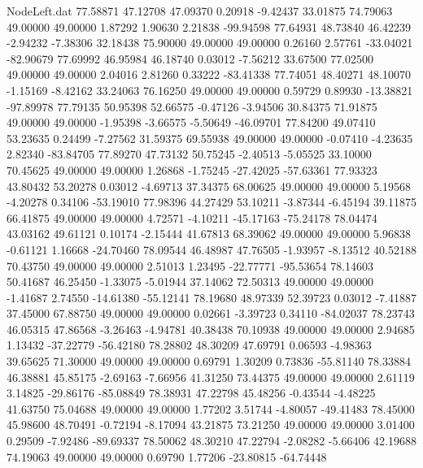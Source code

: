 \begin{filecontents}{NodeLeft.dat}
  77.58871   47.12708   47.09370     0.20918   -9.42437   33.01875   74.79063   49.00000   49.00000    1.87292    1.90630    2.21838  -99.94598
  77.64931   48.73840   46.42239    -2.94232   -7.38306   32.18438   75.90000   49.00000   49.00000    0.26160    2.57761  -33.04021  -82.90679
  77.69992   46.95984   46.18740     0.03012   -7.56212   33.67500   77.02500   49.00000   49.00000    2.04016    2.81260    0.33222  -83.41338
  77.74051   48.40271   48.10070    -1.15169   -8.42162   33.24063   76.16250   49.00000   49.00000    0.59729    0.89930  -13.38821  -97.89978
  77.79135   50.95398   52.66575    -0.47126   -3.94506   30.84375   71.91875   49.00000   49.00000   -1.95398   -3.66575   -5.50649  -46.09701
  77.84200   49.07410   53.23635     0.24499   -7.27562   31.59375   69.55938   49.00000   49.00000   -0.07410   -4.23635    2.82340  -83.84705
  77.89270   47.73132   50.75245    -2.40513   -5.05525   33.10000   70.45625   49.00000   49.00000    1.26868   -1.75245  -27.42025  -57.63361
  77.93323   43.80432   53.20278     0.03012   -4.69713   37.34375   68.00625   49.00000   49.00000    5.19568   -4.20278    0.34106  -53.19010
  77.98396   44.27429   53.10211    -3.87344   -6.45194   39.11875   66.41875   49.00000   49.00000    4.72571   -4.10211  -45.17163  -75.24178
  78.04474   43.03162   49.61121     0.10174   -2.15444   41.67813   68.39062   49.00000   49.00000    5.96838   -0.61121    1.16668  -24.70460
  78.09544   46.48987   47.76505    -1.93957   -8.13512   40.52188   70.43750   49.00000   49.00000    2.51013    1.23495  -22.77771  -95.53654
  78.14603   50.41687   46.25450    -1.33075   -5.01944   37.14062   72.50313   49.00000   49.00000   -1.41687    2.74550  -14.61380  -55.12141
  78.19680   48.97339   52.39723     0.03012   -7.41887   37.45000   67.88750   49.00000   49.00000    0.02661   -3.39723    0.34110  -84.02037
  78.23743   46.05315   47.86568    -3.26463   -4.94781   40.38438   70.10938   49.00000   49.00000    2.94685    1.13432  -37.22779  -56.42180
  78.28802   48.30209   47.69791     0.06593   -4.98363   39.65625   71.30000   49.00000   49.00000    0.69791    1.30209    0.73836  -55.81140
  78.33884   46.38881   45.85175    -2.69163   -7.66956   41.31250   73.44375   49.00000   49.00000    2.61119    3.14825  -29.86176  -85.08849
  78.38931   47.22798   45.48256    -0.43544   -4.48225   41.63750   75.04688   49.00000   49.00000    1.77202    3.51744   -4.80057  -49.41483
  78.45000   45.98600   48.70491    -0.72194   -8.17094   43.21875   73.21250   49.00000   49.00000    3.01400    0.29509   -7.92486  -89.69337
  78.50062   48.30210   47.22794    -2.08282   -5.66406   42.19688   74.19063   49.00000   49.00000    0.69790    1.77206  -23.80815  -64.74448

\end{filecontents}
